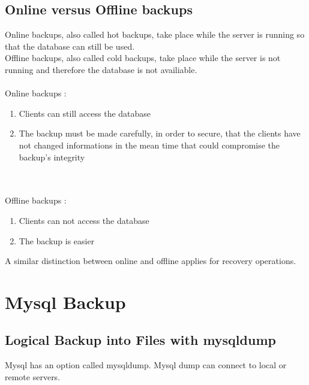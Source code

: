 \documentclass[10pt]{article}
\begin{document}
\subsection{Online versus Offline backups}
Online backups, also called hot backups, take place while the server is running so that the database can still be used.\\
Offline backups, also called cold backups, take place while the server is not running and therefore the database is not availiable. \\ \\
Online backups :
\begin{enumerate}
\item Clients can still access the database
\item The backup must be made carefully, in order to secure, that the clients have not changed informations in the mean time that could compromise the backup's integrity
\end{enumerate} \cite{mysqlbackupandrectypesman}\\ \\
Offline backups :
\begin{enumerate}
\item Clients can not access the database
\item The backup is easier
\end{enumerate}
A similar distinction between online and offline applies for recovery operations.
 \cite{mysqlbackupandrectypesman}
\newpage
\section{Mysql Backup}
\subsection{Logical Backup into Files with mysqldump}
Mysql has an option called mysqldump. Mysql dump can connect to local or remote servers.\cite{mysqlbackupandrectypesman}
\end{document}

